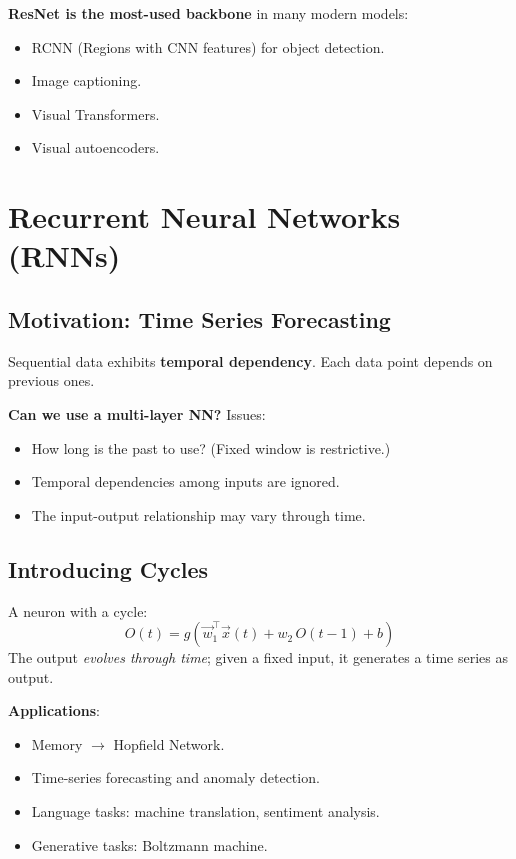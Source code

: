 \documentclass[11pt,a4paper]{article}
\begin{document}
\textbf{ResNet is the most-used backbone} in many modern models:
\begin{itemize}[leftmargin=*]
    \item RCNN (Regions with CNN features) for object detection.
    \item Image captioning.
    \item Visual Transformers.
    \item Visual autoencoders.
\end{itemize}

\newpage
\section{Recurrent Neural Networks (RNNs)}

\subsection{Motivation: Time Series Forecasting}

Sequential data exhibits \textbf{temporal dependency}. Each data point depends on previous ones.

\textbf{Can we use a multi-layer NN?} Issues:
\begin{itemize}[leftmargin=*]
    \item How long is the past to use? (Fixed window is restrictive.)
    \item Temporal dependencies among inputs are ignored.
    \item The input-output relationship may vary through time.
\end{itemize}

\subsection{Introducing Cycles}

\begin{definitionbox}[title=Recurrent Neuron]
A neuron with a cycle:
\[
O(t) = g(\vec{w}_1^\top \vec{x}(t) + w_2\, O(t-1) + b)
\]
The output \emph{evolves through time}; given a fixed input, it generates a time series as output.
\end{definitionbox}

\textbf{Applications}:
\begin{itemize}[leftmargin=*]
    \item Memory $\to$ Hopfield Network.
    \item Time-series forecasting and anomaly detection.
    \item Language tasks: machine translation, sentiment analysis.
    \item Generative tasks: Boltzmann machine.
\end{itemize}
\end{document}
